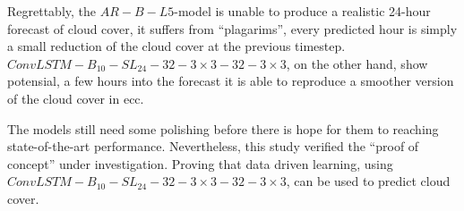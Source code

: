 Regrettably, the $AR-B-L5$-model is unable to produce a realistic 24-hour forecast of cloud cover, it suffers from ``plagarims'', every predicted hour is simply a small reduction of the cloud cover at the previous timestep.
$ConvLSTM-B_{10}-SL_{24}-32-3\times3-32-3 \times3$, on the other hand, show potensial, a few hours into the forecast it is able to reproduce a smoother version of the cloud cover in \acrshort{ecc}.

The models still need some polishing before there is hope for them to reaching state-of-the-art performance. Nevertheless, this study verified the ``proof of concept'' under investigation. Proving that data driven learning, using $ConvLSTM-B_{10}-SL_{24}-32-3\times3-32-3 \times3$, can be used to predict cloud cover.

\cleardoublepage